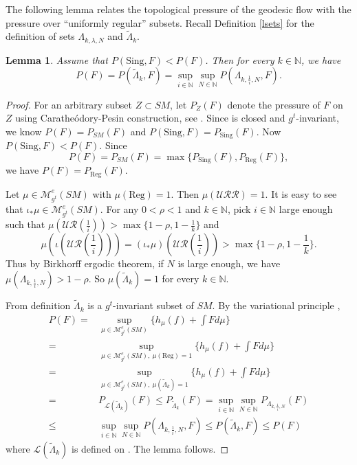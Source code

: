 \documentclass[11pt]{amsart}
\newtheorem{lemma}[theorem]{Lemma}
\theoremstyle{definition}
\def\M{{\mathcal M}}
\newcommand{\UR}{\mathcal{UR}}
\newcommand{\URR}{\mathcal{URR}}
\def\NN{{\mathbb N}}
\def\l{\lambda}   \def\L{\Lambda}
\begin{document}
The following lemma relates the topological pressure of the geodesic flow with the pressure over ``uniformly regular'' subsets.
Recall Definition \ref{lsets} for the definition of sets $\L_{k,\l, N}$ and $\tilde \L_k$.
\begin{lemma}\label{pesin}
Assume that $P(\text{Sing},F)<P(F)$. Then for every $k\in \NN$, we have
$$P(F)=P(\tilde{\L}_k, F)=\sup_{i\in \NN}\sup_{N\in \NN}P(\L_{k,\frac{1}{i},N}, F).$$
\end{lemma}
\begin{proof}
For an arbitrary subset $Z\subset SM$, let $P_Z(F)$ denote the pressure of $F$ on $Z$ using Carathe\'{o}dory-Pesin construction, see \cite[Theorem 11.1]{Pe3}.
Since  is closed and $g^t$-invariant, we know $P(F)=P_{SM}(F)$ and $P(\text{Sing},F)=P_{\text{Sing}}(F)$.
Now $P(\text{Sing},F)<P(F)$. Since 
$$P(F)=P_{SM}(F)=\max\{P_{\text{Sing}}(F),P_{\text{Reg}}(F)\},$$ 
we have $P(F)=P_{\text{Reg}}(F)$.


Let $\mu\in \M_{g^t}^e(SM)$ with $\mu(\text{Reg})=1$. Then $\mu(\URR)=1$. It is easy to see that $\iota_*\mu \in \M^e_{g^t}(SM)$. For any $0<\rho<1$ and $k\in \NN$, pick $i\in \NN$ large enough such that $\mu(\UR(\frac{1}{i}))>\max\{1-\rho, 1-\frac{1}{k}\}$ and
$$\mu(\iota(\UR(\frac{1}{i})))=(\iota_*\mu)(\UR(\frac{1}{i}))>\max\{1-\rho, 1-\frac{1}{k}\}.$$ 
Thus by Birkhorff ergodic theorem, if $N$ is large enough, we have $\mu(\L_{k,\frac{1}{i},N})>1-\rho$. So $\mu(\tilde \L_k)=1$ for every $k\in \NN$. 

From definition $\tilde \L_k$ is a $g^t$-invariant subset of $SM$. By the variational principle  \cite[Theorem A2.1]{Pe3},
\begin{equation*}
\begin{aligned}
P(F)=&\sup_{\mu\in \M^e_{g^t}(SM)}\Big\{h_\mu(f)+\int Fd\mu\Big\}\\
=&\sup_{\mu\in \M^e_{g^t}(SM),\ \mu(\text{Reg})=1 }\Big\{h_\mu(f)+\int Fd\mu\Big\}\\
=&\sup_{\mu\in \M^e_{g^t}(SM),\ \mu(\tilde \L_k)=1}\Big\{h_\mu(f)+\int Fd\mu\Big\}\\
=&P_{\mathcal{L}(\tilde \L_k)}(F)\le P_{\tilde \L_k}(F)=\sup_{i\in \NN}\sup_{N\in \NN}P_{\L_{k,\frac{1}{i},N}}(F)\\
\le &\sup_{i\in \NN}\sup_{N\in \NN}P(\L_{k,\frac{1}{i},N}, F)\le P(\tilde \L_k, F)\le P(F)
\end{aligned}
\end{equation*}
where $\mathcal{L}(\tilde{\L}_k)$ is defined on \cite[p. 88]{Pe3}.
The lemma follows.
\end{proof}
\end{document}
